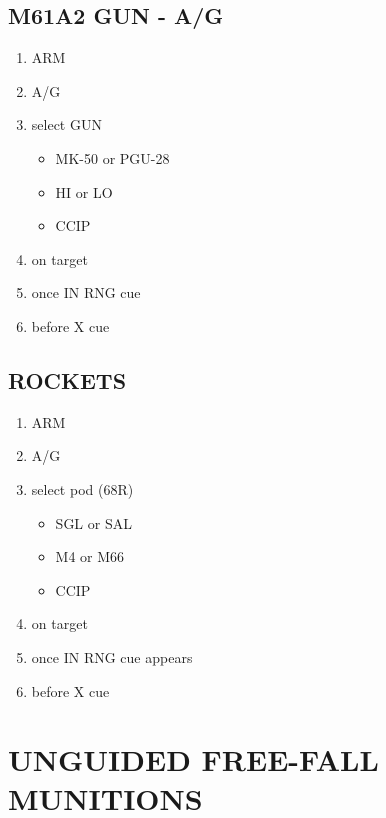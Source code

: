 \documentclass[fontInter]{TechCheck}
\begin{document}
	\subsection{M61A2 GUN - A/G}
	\begin{enumerate}
		\item {}\dotfill ARM
		\item {}\dotfill A/G
		\item {}\dotfill select GUN
		\begin{itemize}
			\item {} MK-50 or PGU-28
			\item {} HI or LO
			\item {} CCIP
		\end{itemize}
		\item {}\dotfill on target
		\item {}\dotfill once IN RNG cue
		\item {}\dotfill before X cue
	\end{enumerate}

	\subsection{ROCKETS}
	\begin{enumerate}
		\item {}\dotfill ARM
		\item {}\dotfill A/G
		\item {}\dotfill select pod (68R)
		\begin{itemize}
			\item {} SGL or SAL
			\item {} M4 or M66
			\item {} CCIP
		\end{itemize}
		\item {}\dotfill on target
		\item {}\dotfill once IN RNG cue appears
		\item {}\dotfill before X cue
	\end{enumerate}

	\clearpage

	\section{UNGUIDED FREE-FALL MUNITIONS}
\end{document}
